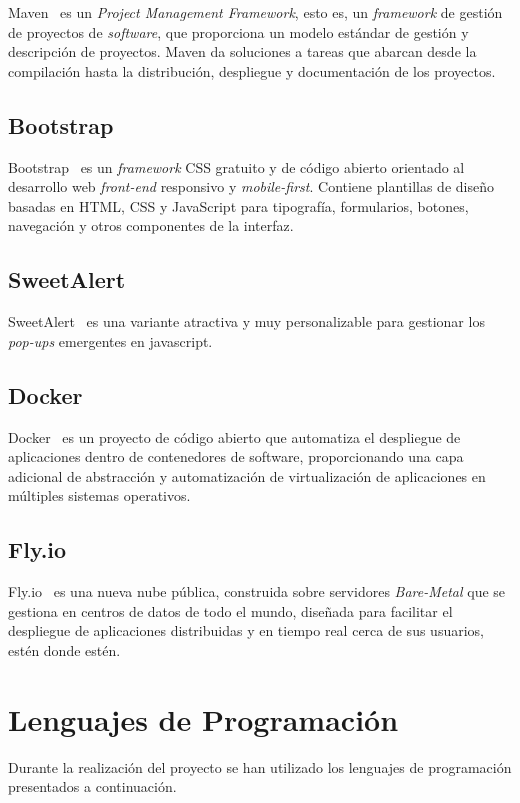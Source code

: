 Maven~\citep{Maven} es un \textit{Project Management Framework}, esto es, un \textit{framework} de gestión de proyectos de \textit{software}, que proporciona un modelo estándar de gestión y descripción de proyectos. Maven da soluciones a tareas que abarcan desde la compilación hasta la distribución, despliegue y documentación de los proyectos.

\subsection{Bootstrap}

Bootstrap~\citep{bootstrap} es un \textit{framework} CSS gratuito y de código abierto orientado al desarrollo web \textit{front-end} responsivo y \textit{mobile-first}. Contiene plantillas de diseño basadas en HTML, CSS y JavaScript para tipografía, formularios, botones, navegación y otros componentes de la interfaz.

\subsection{SweetAlert}

SweetAlert~\citep{sweetAlert} es una variante atractiva y muy personalizable para gestionar los \textit{pop-ups} emergentes en javascript.

\subsection{Docker}

Docker~\citep{docker} es un proyecto de código abierto que automatiza el despliegue de aplicaciones dentro de contenedores de software, proporcionando una capa adicional de abstracción y automatización de virtualización de aplicaciones en múltiples sistemas operativos.

\subsection{Fly.io}

Fly.io~\citep{fly.io} es una nueva nube pública, construida sobre servidores \textit{Bare-Metal} que se gestiona en centros de datos de todo el mundo, diseñada para facilitar el despliegue de aplicaciones distribuidas y en tiempo real cerca de sus usuarios, estén donde estén.

\section{Lenguajes de Programación}
Durante la realización del proyecto se han utilizado los lenguajes de programación presentados a continuación.

